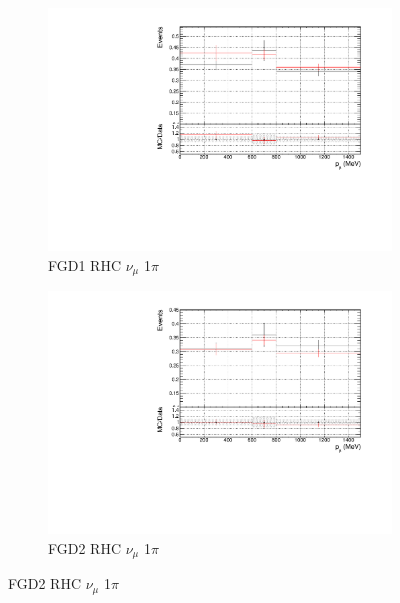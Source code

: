 \begin{figure}[!h]
\begin{subfigure}{0.49\textwidth}
  \centering
  \includegraphics[width=\textwidth]{figs/prioronly1D_p_FGD1_NuMuBkg_CC1pi_in_AntiNu_Mode}
  \caption{FGD1 RHC $\nu_{\mu}$ 1$\pi$}
\end{subfigure}
\begin{subfigure}{0.49\textwidth}
  \centering
  \includegraphics[width=\textwidth]{figs/prioronly1D_p_FGD2_NuMuBkg_CC1pi_in_AntiNu_Mode}
  \caption{FGD2 RHC $\nu_{\mu}$ 1$\pi$}
\end{subfigure}


\end{figure}
